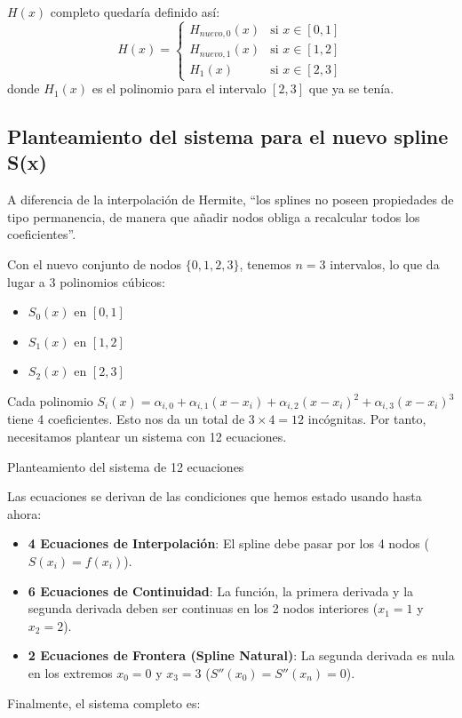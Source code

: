 \documentclass{article}
\begin{document}
$H(x)$ completo quedaría definido así:
$$ H(x) = \begin{cases} H_{nuevo,0}(x) & \text{si } x \in [0,1] \\ H_{nuevo,1}(x) & \text{si } x \in [1,2] \\ H_1(x) & \text{si } x \in [2,3] \end{cases} $$
donde $H_1(x)$ es el polinomio para el intervalo $[2,3]$ que ya se tenía.


\subsection{Planteamiento del sistema para el nuevo spline S(x)}

A diferencia de la interpolación de Hermite, ``los splines no poseen propiedades de tipo permanencia, de manera que añadir nodos obliga a recalcular todos los coeficientes''.

Con el nuevo conjunto de nodos $\{0, 1, 2, 3\}$, tenemos $n=3$ intervalos, lo que da lugar a 3 polinomios cúbicos:
\begin{itemize}
    \item $S_0(x)$ en $[0,1]$
    \item $S_1(x)$ en $[1,2]$
    \item $S_2(x)$ en $[2,3]$
\end{itemize}

Cada polinomio $S_i(x) = \alpha_{i,0} + \alpha_{i,1}(x-x_i) + \alpha_{i,2}(x-x_i)^2 + \alpha_{i,3}(x-x_i)^3$ tiene 4 coeficientes. Esto nos da un total de $3 \times 4 = 12$ incógnitas. Por tanto, necesitamos plantear un sistema con 12 ecuaciones.

Planteamiento del sistema de 12 ecuaciones

Las ecuaciones se derivan de las condiciones que hemos estado usando hasta ahora:
\begin{itemize}
    \item \textbf{4 Ecuaciones de Interpolación}: El spline debe pasar por los 4 nodos ($S(x_i)=f(x_i)$).
    \item \textbf{6 Ecuaciones de Continuidad}: La función, la primera derivada y la segunda derivada deben ser continuas en los 2 nodos interiores ($x_1=1$ y $x_2=2$).
    \item \textbf{2 Ecuaciones de Frontera (Spline Natural)}: La segunda derivada es nula en los extremos $x_0=0$ y $x_3=3$ ($S''(x_0)=S''(x_n)=0$).
\end{itemize}

Finalmente, el sistema completo es:
\end{document}
